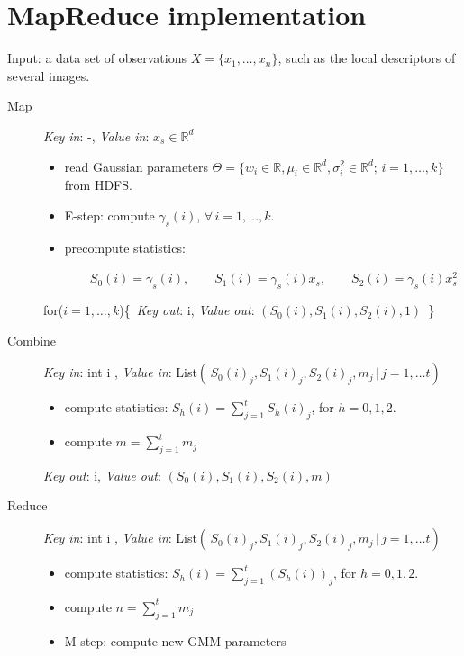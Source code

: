 \documentclass[a4paper,10pt]{article}
\begin{document}
\section{MapReduce implementation}
Input: a data set of observations $X=\{x_1, \dots, x_n\}$, such as the local descriptors of  several images.
\begin{description}
	
	\item[{Map}]
	\textit{Key in}: -, \textit{Value in}: $ x_s\in \mathbb{R}^d$ 
	\begin{itemize}
		\item read Gaussian parameters $\Theta=\{w_i \in \mathbb{R}, \mu_{i}\in\mathbb{R}^d, \sigma_i^2 \in \mathbb{R}^{d};\, i=1,\dots, k\}$ from HDFS.
		\item E-step: compute 	$\gamma_s(i)$, $\forall\, i=1,\dots,k$.
		\item precompute statistics:
		
		$
		\qquad S_0(i)=\gamma_s(i),  \qquad
		S_1(i) =\gamma_s(i) x_s, \qquad
		S_2 (i) = \gamma_s(i)  x_s^2 
		$
		
	\end{itemize}
	for($i=1,\dots, k$)\{$\,$ \textit{Key out}:  i, \textit{Value out}: $(S_0(i),S_1(i),S_2(i), 1)$\,	\}
	
	\item[Combine] 
	\textit{Key in}: int i , \textit{Value in}: List$\left(\, S_0(i)_j,S_1(i)_j,S_2(i)_j, m_j\, | \,j=1,\dots t\right)$
	\begin{itemize}
		\item compute statistics:	
		$S_h(i)=\sum_{j=1}^{t} S_h(i)_j$,  for $h=0,1,2$.
		\item compute $m=\sum_{j=1}^{t} m_j$
			\end{itemize}
		\textit{Key out}:  i, \textit{Value out}: $(S_0(i),S_1(i),S_2(i), m)$\,
	\item[Reduce] 
	\textit{Key in}: int i , \textit{Value in}: List$\left(\, S_0(i)_j,S_1(i)_j,S_2(i)_j, m_j\, | \,j=1,\dots t\right)$
	\begin{itemize}
		\item compute statistics:	
		$S_h(i)=\sum_{j=1}^{t} (S_h(i))_j$,  for $h=0,1,2$.
		\item compute $n=\sum_{j=1}^{t} m_j$
		\item M-step: compute new GMM parameters
		

\end{itemize}
\end{description}
\end{document}
